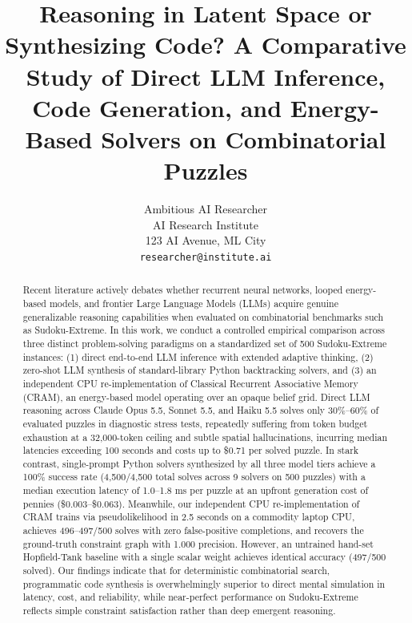 \documentclass{article} %
\title{Reasoning in Latent Space or Synthesizing Code? A Comparative Study of Direct LLM Inference, Code Generation, and Energy-Based Solvers on Combinatorial Puzzles}
\author{Ambitious AI Researcher\\
AI Research Institute\\
123 AI Avenue, ML City\\
\texttt{researcher@institute.ai}
}
\begin{document}
\maketitle

\begin{abstract}
Recent literature actively debates whether recurrent neural networks, looped energy-based models, and frontier Large Language Models (LLMs) acquire genuine generalizable reasoning capabilities when evaluated on combinatorial benchmarks such as Sudoku-Extreme. In this work, we conduct a controlled empirical comparison across three distinct problem-solving paradigms on a standardized set of 500 Sudoku-Extreme instances: (1) direct end-to-end LLM inference with extended adaptive thinking, (2) zero-shot LLM synthesis of standard-library Python backtracking solvers, and (3) an independent CPU re-implementation of Classical Recurrent Associative Memory (CRAM), an energy-based model operating over an opaque belief grid. Direct LLM reasoning across Claude Opus 5.5, Sonnet 5.5, and Haiku 5.5 solves only 30\%--60\% of evaluated puzzles in diagnostic stress tests, repeatedly suffering from token budget exhaustion at a 32,000-token ceiling and subtle spatial hallucinations, incurring median latencies exceeding 100 seconds and costs up to \$0.71 per solved puzzle. In stark contrast, single-prompt Python solvers synthesized by all three model tiers achieve a 100\% success rate (4,500/4,500 total solves across 9 solvers on 500 puzzles) with a median execution latency of 1.0--1.8 ms per puzzle at an upfront generation cost of pennies (\$0.003--\$0.063). Meanwhile, our independent CPU re-implementation of CRAM trains via pseudolikelihood in 2.5 seconds on a commodity laptop CPU, achieves 496--497/500 solves with zero false-positive completions, and recovers the ground-truth constraint graph with 1.000 precision. However, an untrained hand-set Hopfield-Tank baseline with a single scalar weight achieves identical accuracy (497/500 solved). Our findings indicate that for deterministic combinatorial search, programmatic code synthesis is overwhelmingly superior to direct mental simulation in latency, cost, and reliability, while near-perfect performance on Sudoku-Extreme reflects simple constraint satisfaction rather than deep emergent reasoning.
\end{abstract}
\end{document}
